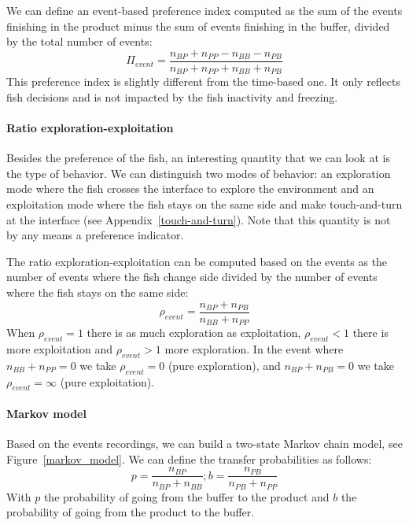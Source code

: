  We can define an event-based preference index computed as the sum of the events finishing in the product minus the sum of events finishing in the buffer, divided by the total number of events:
  \begin{equation}
    \Pi_{event} = \frac{n_{BP} + n_{PP} - n_{BB} - n_{PB}}{n_{BP} + n_{PP} + n_{BB} + n_{PB}}
  \end{equation}
  \noindent This preference index is slightly different from the time-based one. It only reflects fish decisions and is not impacted by the fish inactivity and freezing.

  \paragraph{Ratio exploration-exploitation} Besides the preference of the fish, an interesting quantity that we can look at is the type of behavior. We can distinguish two modes of behavior: an exploration mode where the fish crosses the interface to explore the environment and an exploitation mode where the fish stays on the same side and make touch-and-turn at the interface (see Appendix~\ref{touch-and-turn}). Note that this quantity is not by any means a preference indicator.

  The ratio exploration-exploitation can be computed based on the events as the number of events where the fish change side divided by the number of events where the fish stays on the same side:
  \begin{equation}
    \rho_{event} = \frac{n_{BP} + n_{PB}}{n_{BB} + n_{PP}}
  \end{equation}
\noindent When $\rho_{event} = 1$ there is as much exploration as exploitation, $\rho_{event} < 1$ there is more exploitation and $\rho_{event} > 1$ more exploration. In the event where $n_{BB} + n_{PP} = 0$ we take $\rho_{event} = 0$ (pure exploration),  and $n_{BP} + n_{PB} = 0$ we take $\rho_{event} = \infty$ (pure exploitation).

  \paragraph{Markov model} Based on the events recordings, we can build a two-state Markov chain model, see Figure~\ref{markov_model}. We can define the transfer probabilities as follows:
  \begin{equation}
    p = \frac{n_{BP}}{n_{BP} + n_{BB}} ;
    b = \frac{n_{PB}}{n_{PB} + n_{PP}}
  \end{equation}
  \noindent With $p$ the probability of going from the buffer to the product and $b$ the probability of going from the product to the buffer.

